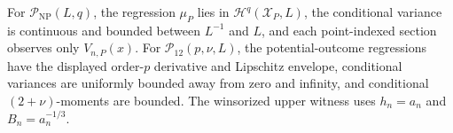 For \(\mathcal P_{\mathrm{NP}}(L,q)\), the regression \(\mu_P\) lies in \(\mathcal H^q(\mathcal X_P,L)\), the conditional variance is continuous and bounded between \(L^{-1}\) and \(L\), and each point-indexed section observes only \(V_{n,P}(x)\).  For \(\mathcal P_{12}(p,\nu,L)\), the potential-outcome regressions have the displayed order-\(p\) derivative and Lipschitz envelope, conditional variances are uniformly bounded away from zero and infinity, and conditional \((2+\nu)\)-moments are bounded.  The winsorized upper witness uses \(h_n=a_n\) and \(B_n=a_n^{-1/3}\).